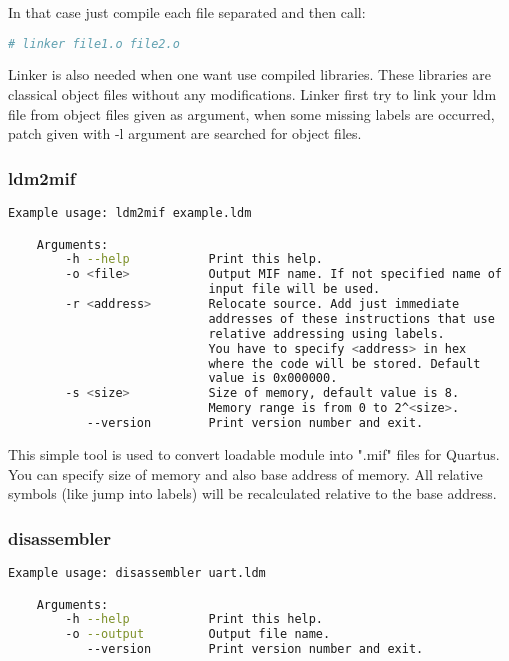 In that case just compile each file separated and then call:

\begin{lstlisting}[language=bash, frame=single]
    # linker file1.o file2.o
\end{lstlisting}

Linker is also needed when one want use compiled libraries. These 
libraries are classical object files without any modifications. Linker 
first try to link your ldm file from object files given as argument, 
when some missing labels are occurred, patch given with -l argument are 
searched for object files. 

\subsubsection{ldm2mif}

\begin{lstlisting}[language=bash, frame=single]
    Example usage: ldm2mif example.ldm

    Arguments:
        -h --help           Print this help.
        -o <file>           Output MIF name. If not specified name of
                            input file will be used.
        -r <address>        Relocate source. Add just immediate
                            addresses of these instructions that use
                            relative addressing using labels.
                            You have to specify <address> in hex
                            where the code will be stored. Default
                            value is 0x000000.
        -s <size>           Size of memory, default value is 8.
                            Memory range is from 0 to 2^<size>.
           --version        Print version number and exit.
\end{lstlisting}

This simple tool is used to convert loadable module into ".mif" files for
Quartus. You can specify size of memory and also base address of memory. All
relative symbols (like jump into labels) will be recalculated relative to the
base address.

\subsubsection{disassembler}

\begin{lstlisting}[language=bash, frame=single]
    Example usage: disassembler uart.ldm

    Arguments:
        -h --help           Print this help.
        -o --output         Output file name.
           --version        Print version number and exit.
\end{lstlisting}

